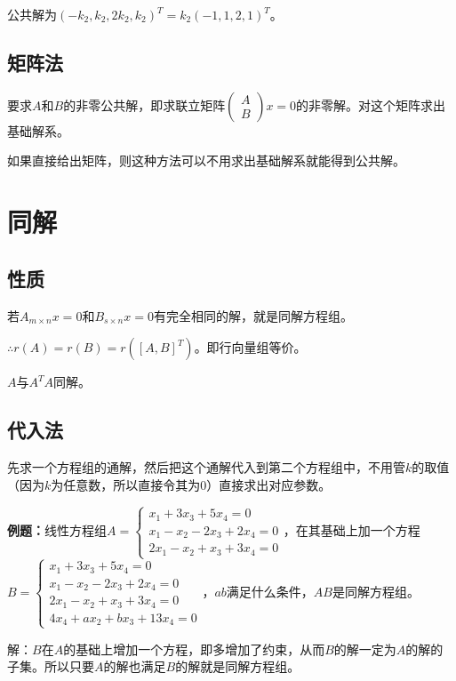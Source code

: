 \documentclass[UTF8, 12pt]{ctexart}
\begin{document}
公共解为$(-k_2,k_2,2k_2,k_2)^T=k_2(-1,1,2,1)^T$。

\subsection{矩阵法}

要求$A$和$B$的非零公共解，即求联立矩阵$\left(\begin{array}{c}
A \\
B
\end{array}\right)x=0$的非零解。对这个矩阵求出基础解系。

如果直接给出矩阵，则这种方法可以不用求出基础解系就能得到公共解。

\section{同解}

\subsection{性质}

若$A_{m\times n}x=0$和$B_{s\times n}x=0$有完全相同的解，就是同解方程组。

$\therefore r(A)=r(B)=r([A,B]^T)$。即行向量组等价。

$A$与$A^TA$同解。

\subsection{代入法}

先求一个方程组的通解，然后把这个通解代入到第二个方程组中，不用管$k$的取值（因为$k$为任意数，所以直接令其为0）直接求出对应参数。

\textbf{例题：}线性方程组$A=\left\{\begin{array}{l}
x_1+3x_3+5x_4=0 \\
x_1-x_2-2x_3+2x_4=0 \\
2x_1-x_2+x_3+3x_4=0
\end{array}\right.$，在其基础上加一个方程$B=\left\{\begin{array}{l}
x_1+3x_3+5x_4=0 \\
x_1-x_2-2x_3+2x_4=0 \\
2x_1-x_2+x_3+3x_4=0 \\
4x_4+ax_2+bx_3+13x_4=0
\end{array}\right.$，$ab$满足什么条件，$AB$是同解方程组。

解：$B$在$A$的基础上增加一个方程，即多增加了约束，从而$B$的解一定为$A$的解的子集。所以只要$A$的解也满足$B$的解就是同解方程组。
\end{document}
